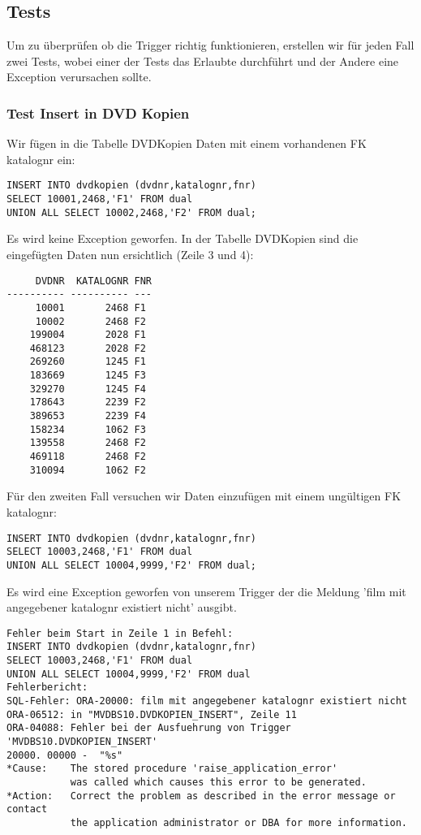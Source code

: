 \documentclass[11pt,a4paper,parskip=half]{scrartcl}
\begin{document}
\subsection{Tests}
Um zu überprüfen ob die Trigger richtig funktionieren, erstellen wir für jeden Fall zwei Tests, wobei einer der Tests das Erlaubte durchführt und der Andere eine Exception verursachen sollte.

\subsubsection{Test Insert in DVD Kopien}
Wir fügen in die Tabelle DVDKopien Daten mit einem vorhandenen FK katalognr ein:

\begin{lstlisting}
INSERT INTO dvdkopien (dvdnr,katalognr,fnr) 
SELECT 10001,2468,'F1' FROM dual 
UNION ALL SELECT 10002,2468,'F2' FROM dual;
\end{lstlisting}

Es wird keine Exception geworfen. In der Tabelle DVDKopien sind die eingefügten Daten nun ersichtlich (Zeile 3 und 4):

\begin{lstlisting}
     DVDNR  KATALOGNR FNR
---------- ---------- ---
     10001       2468 F1  
     10002       2468 F2  
    199004       2028 F1  
    468123       2028 F2  
    269260       1245 F1  
    183669       1245 F3  
    329270       1245 F4  
    178643       2239 F2  
    389653       2239 F4  
    158234       1062 F3  
    139558       2468 F2  
    469118       2468 F2  
    310094       1062 F2  
\end{lstlisting}

Für den zweiten Fall versuchen wir Daten einzufügen mit einem ungültigen FK katalognr:

\begin{lstlisting}
INSERT INTO dvdkopien (dvdnr,katalognr,fnr) 
SELECT 10003,2468,'F1' FROM dual 
UNION ALL SELECT 10004,9999,'F2' FROM dual;
\end{lstlisting}

Es wird eine Exception geworfen von unserem Trigger der die Meldung 'film mit angegebener katalognr existiert nicht' ausgibt.

\begin{lstlisting}
Fehler beim Start in Zeile 1 in Befehl:
INSERT INTO dvdkopien (dvdnr,katalognr,fnr) 
SELECT 10003,2468,'F1' FROM dual 
UNION ALL SELECT 10004,9999,'F2' FROM dual
Fehlerbericht:
SQL-Fehler: ORA-20000: film mit angegebener katalognr existiert nicht
ORA-06512: in "MVDBS10.DVDKOPIEN_INSERT", Zeile 11
ORA-04088: Fehler bei der Ausfuehrung von Trigger 'MVDBS10.DVDKOPIEN_INSERT'
20000. 00000 -  "%s"
*Cause:    The stored procedure 'raise_application_error'
           was called which causes this error to be generated.
*Action:   Correct the problem as described in the error message or contact
           the application administrator or DBA for more information.
\end{lstlisting}
\end{document}
